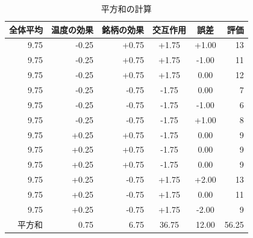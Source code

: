 \begin{table}[ht]
	\centering
	\caption{平方和の計算}
	\begin{tabular}{rrrccr}
		\hline
		全体平均 & 温度の効果 & 銘柄の効果 & 交互作用  & 誤差    & 評価    \\
		\hline
		9.75 & -0.25 & +0.75 & +1.75 & +1.00 & 13    \\
		9.75 & -0.25 & +0.75 & +1.75 & -1.00 & 11    \\
		9.75 & -0.25 & +0.75 & +1.75 & 0.00  & 12    \\ \hline
		9.75 & -0.25 & -0.75 & -1.75 & 0.00  & 7     \\
		9.75 & -0.25 & -0.75 & -1.75 & -1.00 & 6     \\
		9.75 & -0.25 & -0.75 & -1.75 & +1.00 & 8     \\ \hline
		9.75 & +0.25 & +0.75 & -1.75 & 0.00  & 9     \\
		9.75 & +0.25 & +0.75 & -1.75 & 0.00  & 9     \\
		9.75 & +0.25 & +0.75 & -1.75 & 0.00  & 9     \\ \hline
		9.75 & +0.25 & -0.75 & +1.75 & +2.00 & 13    \\
		9.75 & +0.25 & -0.75 & +1.75 & 0.00  & 11    \\
		9.75 & +0.25 & -0.75 & +1.75 & -2.00 & 9     \\
		\hline\hline
		平方和  & 0.75  & 6.75  & 36.75 & 12.00 & 56.25 \\\hline
	\end{tabular}
	\label{tbl::13_04}
\end{table}
